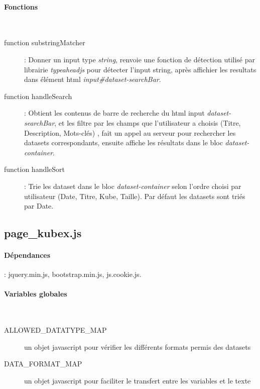 \documentclass[a4paper]{report}
\begin{document}
\paragraph{Fonctions}~\\
\begin{description}
	\item[function substringMatcher]: Donner un input type \emph{string}, renvoie une fonction de détection utilisé par librairie \emph{typeaheadjs} pour détecter l'input string, après affichier les resultats dans élément html \emph{input\#dataset-searchBar}.
	
	\item[function handleSearch]: Obtient les contenus de barre de recherche du html input \emph{dataset-searchBar}, et les filtre par les champs que l'utilisateur a choisis (Titre, Description, Mots-clés) , fait un appel au serveur pour rechercher les datasets correspondants, ensuite affiche les résultats dans le bloc \emph{dataset-container}.
	
	\item[function handleSort]: Trie les dataset dans le bloc \emph{dataset-container} selon l'ordre choisi par utilisateur (Date, Titre, Kube, Taille). Par défaut les datasets sont triés par Date.
\end{description}

\subsection{page\_kubex.js}
\paragraph{Dépendances} : jquery.min.js, bootstrap.min.js, js.cookie.js.

\paragraph{Variables globales}~\\
\begin{description}
	\item[ALLOWED\_DATATYPE\_MAP] un objet javascript pour vérifier les différents formats permis des datasets
	\item[DATA\_FORMAT\_MAP] un objet javascript pour faciliter le transfert entre les variables et le texte
\end{description}
\end{document}
